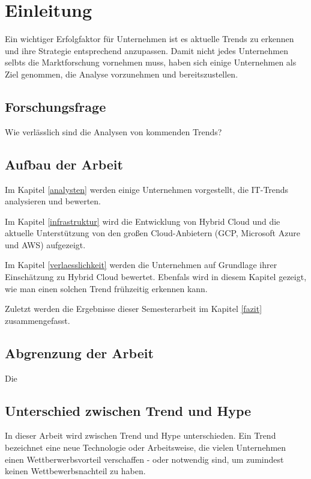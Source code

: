 \newpage
\section{Einleitung} \label{Einleitung}
Ein wichtiger Erfolgfaktor für Unternehmen ist es aktuelle Trends zu erkennen
und ihre Strategie entsprechend anzupassen. Damit nicht jedes Unternehmen selbts
die Marktforschung vornehmen muss, haben sich einige Unternehmen als Ziel
genommen, die Analyse vorzunehmen und bereitszustellen. 


\subsection{Forschungsfrage}
Wie verlässlich sind die Analysen von kommenden Trends?

\subsection{Aufbau der Arbeit}

Im Kapitel \ref{analysten} werden einige Unternehmen vorgestellt, die IT-Trends
analysieren und bewerten.

Im Kapitel \ref{infrastruktur} wird die Entwicklung von Hybrid Cloud und die
aktuelle Unterstützung von den großen Cloud-Anbietern (\ac{GCP}, Microsoft Azure und
\ac{AWS}) aufgezeigt.

Im Kapitel \ref{verlaesslichkeit} werden die Unternehmen auf Grundlage ihrer
Einschätzung zu Hybrid Cloud bewertet. Ebenfals wird in diesem Kapitel gezeigt,
wie man einen solchen Trend frühzeitig erkennen kann.

Zuletzt werden die Ergebnisse dieser Semesterarbeit im Kapitel \ref{fazit}
zusammengefasst.

\subsection{Abgrenzung der Arbeit}
Die 

\subsection{Unterschied zwischen Trend und Hype}

In dieser Arbeit wird zwischen Trend und Hype unterschieden. Ein Trend
bezeichnet eine neue Technologie oder Arbeitsweise, die vielen Unternehmen einen
Wettberwerbsvorteil verschaffen - oder notwendig sind, um zumindest keinen
Wettbewerbsnachteil zu haben.

